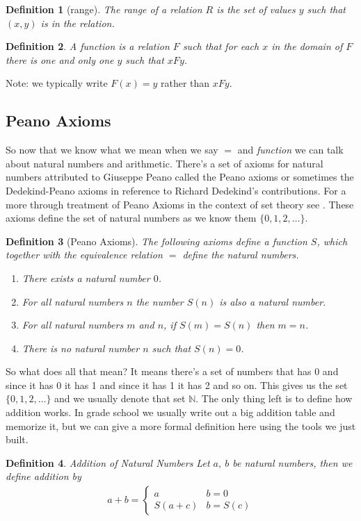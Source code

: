 \documentclass[oneside]{book}
\newtheorem{definition}{Definition}
\newcommand{\set}[1]{\{#1\}}
\begin{document}
\begin{spacing}{1.618}
\begin{definition}[range]
	The range of a relation $R$ is the set of values $y$ such that $(x, y)$ is in the relation. 
\end{definition}


\begin{definition}
	A function is a relation $F$ such that for each $x$ in the domain of $F$ there is one and only one $y$ such that $xFy$. 
\end{definition}

Note: we typically write $F(x)=y$ rather than $xFy$. 

\subsection{Peano Axioms}
So now that we know what we mean when we say $=$ and \emph{function} we can talk about natural numbers and arithmetic. There's a set of axioms for natural numbers attributed to Giuseppe Peano called the Peano axioms or sometimes the Dedekind-Peano axioms in reference to Richard Dedekind's contributions. For a more through treatment of Peano Axioms in the context of set theory see \cite{suppes72}. These axioms define the set of natural numbers as we know them $\set{0, 1, 2, \dots}$. 

\begin{definition}[Peano Axioms]
The following axioms define a function $S$, which together with the equivalence relation $=$ define the natural numbers. 
\begin{enumerate}
	\item There exists a natural number $0$. 
	\item For all natural numbers $n$ the number $S(n)$ is also a natural number. 
	\item For all natural numbers $m$ and $n$, if $S(m)=S(n)$ then $m=n$. 
	\item There is no natural number $n$ such that $S(n)=0$. 
\end{enumerate}
\end{definition}

So what does all that mean? It means there's a set of numbers that has 0 and since it has 0 it has 1 and since it has 1 it has 2 and so on. This gives us the set $\set{0, 1, 2, \dots}$ and we usually denote that set $\mathbb{N}$. The only thing left is to define how addition works. In grade school we usually write out a big addition table and memorize it, but we can give a more formal definition here using the tools we just built. 

\begin{definition}{Addition of Natural Numbers}
	Let $a,~b$ be natural numbers, then we define addition by
	\begin{alignat*}{4}
		a+b=\begin{cases}
			a&b=0 \\
			S(a+c)&b=S(c)
		\end{cases}
	\end{alignat*}
\end{definition}


\end{spacing}
\backmatter
\end{document}

